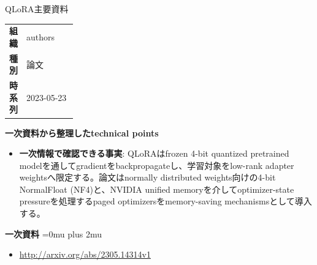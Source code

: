 \begin{technicalnote}{QLoRA}{主要資料}
\begingroup
\begin{tabularx}{\linewidth}{@{}>{\bfseries}p{0.22\linewidth}X@{}}
組織 & authors \\
種別 & 論文 \\
時系列 & 2023-05-23 \\
\end{tabularx}
\smallskip
{\bfseries 一次資料から整理したtechnical points}
\begin{itemize}[leftmargin=1.5em,itemsep=0.35em]
\item \textbf{一次情報で確認できる事実}: QLoRAはfrozen 4-bit quantized pretrained modelを通してgradientをbackpropagateし、学習対象をlow-rank adapter weightsへ限定する。論文はnormally distributed weights向けの4-bit NormalFloat (NF4)と、NVIDIA unified memoryを介してoptimizer-state pressureを処理するpaged optimizersをmemory-saving mechanismsとして導入する。
\end{itemize}
\begin{minipage}{\linewidth}
\begin{samepage}
{\bfseries 一次資料}
\begingroup\sloppy
\Urlmuskip=0mu plus 2mu\relax
\begin{itemize}[leftmargin=1.5em,itemsep=0.25em]
\item {\scriptsize\url{http://arxiv.org/abs/2305.14314v1}}
\end{itemize}
\endgroup
\end{samepage}
\end{minipage}
\endgroup
\end{technicalnote}
\medskip

